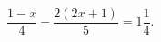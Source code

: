 \begin{ex}[type=equation]
	\begin{condition}
		$\dfrac{1-x}{4}-\dfrac{2(2x + 1)}{5} = 1\dfrac{1}{4}.$
	\end{condition}
\end{ex}